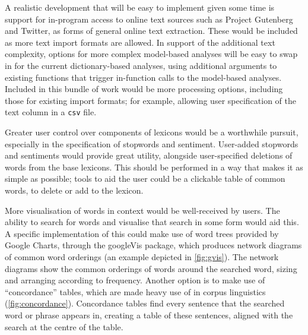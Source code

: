 \documentclass[11pt, a4paper, titlepage]{report}
\begin{document}
A realistic development that will be easy to implement given some time
is support for in-program access to online text sources such as
Project Gutenberg and Twitter, as forms of general online text
extraction. These would be included as more text import formats are
allowed. In support of the additional text complexity, options for
more complex model-based analyses will be easy to swap in for the
current dictionary-based analyses, using additional arguments to
existing functions that trigger in-function calls to the model-based
analyses. Included in this bundle of work would be more processing
options, including those for existing import formats; for example,
allowing user specification of the text column in a \texttt{csv} file.

Greater user control over components of lexicons would be a worthwhile
pursuit, especially in the specification of stopwords and sentiment.
User-added stopwords and sentiments would provide great utility,
alongside user-specified deletions of words from the base lexicons.
This should be performed in a way that makes it as simple as possible;
tools to aid the user could be a clickable table of common words, to
delete or add to the lexicon.

More visualisation of words in context would be well-received by
users. The ability to search for words and visualise that search in
some form would aid this. A specific implementation of this could make
use of word trees provided by Google Charts, through the
googleVis\autocite{gesmann11} package, which produces network diagrams
of common word orderings (an example depicted in
\underline{\cref{fig:gvis}}). The network diagrams show the common
orderings of words around the searched word, sizing and arranging
according to frequency. Another option is to make use of
``concordance'' tables, which are made heavy use of in corpus
linguistics (\underline{\cref{fig:concordance}}). Concordance tables
find every sentence that the searched word or phrase appears in,
creating a table of these sentences, aligned with the search at the
centre of the table.
\end{document}
